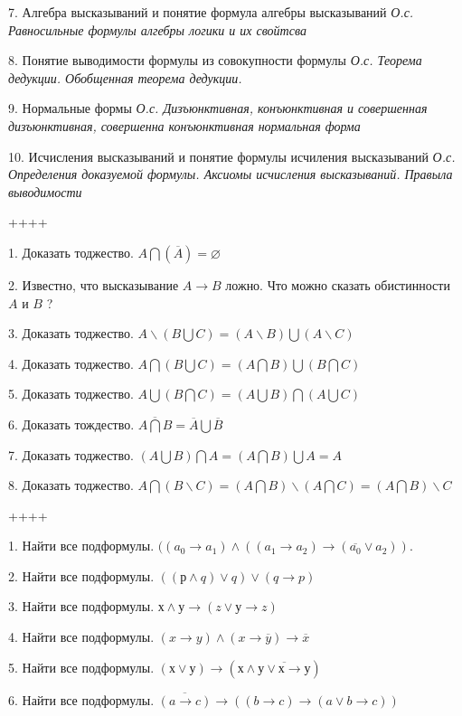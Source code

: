 7. Алгебра высказываний и понятие формула алгебры высказываний \emph{О.с. Равносильные формулы алгебры логики и их свойтсва}

8. Понятие выводимости формулы из совокупности формулы \emph{О.с. Теорема дедукции. Обобщенная теорема дедукции.}

9. Нормальные формы \emph{О.с. Дизъюнктивная, конъюнктивная и совершенная дизъюнктивная, совершенна конъюнктивная нормальная форма}

10. Исчисления высказываний и понятие формулы исчиления высказываний \emph{О.с. Определения доказуемой формулы. Аксиомы исчисления высказываний. Правыла выводимости}

++++

1. Доказать тоджество. \(A\bigcap(\overline{A}) = \varnothing\)

2. Известно, что высказывание \(A \rightarrow B\) ложно. Что можно сказать обистинности \(A\) и \(B\) ?

3. Доказать тоджество. \(A\backslash(B\bigcup C) = (A\backslash B)\bigcup(A\backslash C)\)

4. Доказать тоджество. \(A\bigcap(B\bigcup C) = (A\bigcap B)\bigcup(B\bigcap C)\)

5. Доказать тоджество. \(A\bigcup(B\bigcap C) = (A\bigcup B)\bigcap(A\bigcup C)\)

6. Доказать тождество. \(\overline{A\bigcap B} = \overline{A}\bigcup\overline{B}\)

7. Доказать тоджество. \((A\bigcup B)\bigcap A = (A\bigcap B)\bigcup A = A\)

8. Доказать тоджество. \(A\bigcap(B\backslash C) = (A\bigcap B)\backslash(A\bigcap C) = (A\bigcap B)\backslash C\)

++++

1. Найти все подформулы. \(((a_{0} \rightarrow a_{1}) \land ((a_{1} \rightarrow a_{2}) \rightarrow (\overline{a_{0}} \vee a_{2})).\)

2. Найти все подформулы. \(\left( (р \land q) \vee q \right) \vee (q \rightarrow p)\)

3. Найти все подформулы. \(х \land у \rightarrow (z \vee у \rightarrow z)\)

4. Найти все подформулы. \((x \rightarrow y) \land (x \rightarrow \overline{y}) \rightarrow \overline{x}\)

5. Найти все подформулы. \((х \vee у) \rightarrow \left( х \land \overline{у \vee х \rightarrow у} \right)\)

6. Найти все подформулы. \(\overline{(a \rightarrow c)} \rightarrow \left( (b \rightarrow c) \rightarrow (a \vee b \rightarrow c) \right)\)

